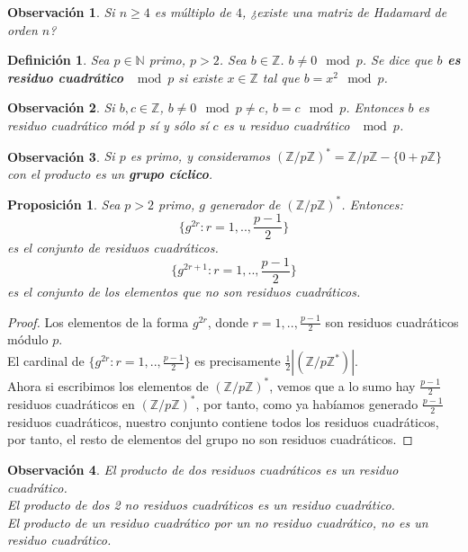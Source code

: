\documentclass[spanish]{book}
\newtheorem{mydef}{Definición}
\newtheorem{obsv}{Observación}
\newtheorem{proposi}{Proposición}
\begin{document}
\begin{obsv}
	Si $n\geq 4$ es múltiplo de $4$, ¿existe una matriz de Hadamard de orden $n$?
\end{obsv}

\begin{mydef}
	Sea $p \in \mathbb{N}$ primo, $p>2$. Sea $b \in \mathbb{Z}$. $b \neq 0 \mod p$. Se dice que \textbf{$b$ es residuo cuadrático $\mod p$} si existe $x \in \mathbb{Z}$ tal que $b = x^2 \mod p$.
\end{mydef}

\begin{obsv}
	Si $b, c \in \mathbb{Z}$, $b \neq 0 \mod p \neq c$, $b = c \mod p$. Entonces $b$ es residuo cuadrático mód $p$ sí y sólo sí $c$ es u residuo cuadrático $\mod p$.
\end{obsv}

\begin{obsv}
	Si $p$ es primo, y consideramos $(\mathbb{Z} / p \mathbb{Z})^*=\mathbb{Z}/p \mathbb{Z}-\{0+p\mathbb{Z}\}$ con el producto es un \textbf{grupo cíclico}.
\end{obsv}


\begin{proposi}
	Sea $p>2$ primo, $g$ generador de $(\mathbb{Z} / p \mathbb{Z})^*$. Entonces: \\
	$$\{g^{2r}: r=1,.., \frac{p-1}{2}\}$$ es el conjunto de residuos cuadráticos.
	$$\{g^{2r+1}: r=1,.., \frac{p-1}{2}\}$$ es el conjunto de los elementos que no son residuos cuadráticos.
\end{proposi}

\begin{proof}
	Los elementos de la forma $g^{2r}$, donde $r=1,.., \frac{p-1}{2}$ son residuos cuadráticos módulo $p$. \\
	El cardinal de $\{g^{2r}: r=1,.., \frac{p-1}{2}\}$ es precisamente $\frac{1}{2}|(\mathbb{Z}/p \mathbb{Z}^*)|$. \\
	Ahora si escribimos los elementos de $(\mathbb{Z} / p \mathbb{Z})^*$, vemos que a lo sumo hay $\frac{p-1}{2}$ residuos cuadráticos en $(\mathbb{Z} / p \mathbb{Z})^*$, por tanto, como ya habíamos generado $\frac{p-1}{2}$ residuos cuadráticos, nuestro conjunto contiene todos los residuos cuadráticos, por tanto, el resto de elementos del grupo no son residuos cuadráticos.
\end{proof}

\begin{obsv}
	El producto de dos residuos cuadráticos es un residuo cuadrático. \\
	El producto de dos 2 no residuos cuadráticos es un residuo cuadrático. \\
	El producto de un residuo cuadrático por un no residuo cuadrático, no es un residuo cuadrático.
\end{obsv}
\end{document}
